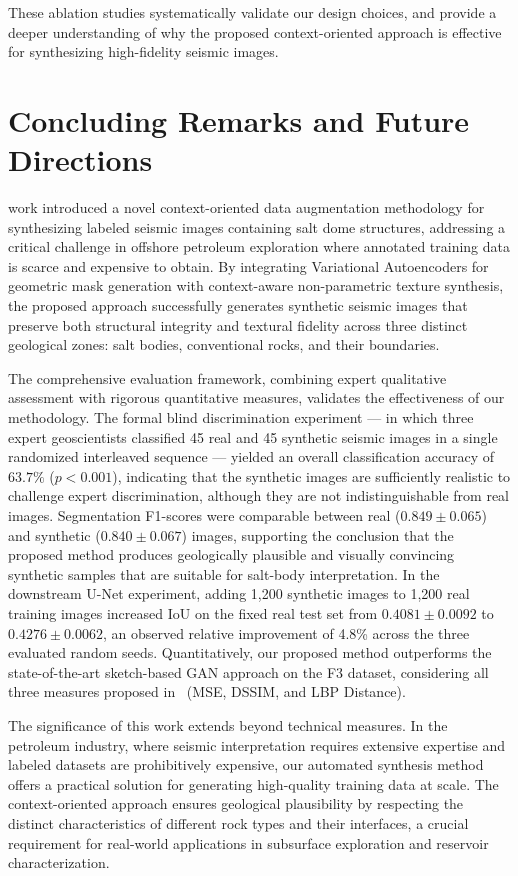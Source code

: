\documentclass{ieeeaccess}
\begin{document}
These ablation studies systematically validate our design choices, and provide a deeper understanding of why the proposed context-oriented approach is effective for synthesizing high-fidelity seismic images.


\section{Concluding Remarks and Future Directions}
\label{sec:conclusion}

 work introduced a novel context-oriented data augmentation methodology for synthesizing labeled seismic images containing salt dome structures, addressing a critical challenge in offshore petroleum exploration where annotated training data is scarce and expensive to obtain. By integrating Variational Autoencoders for geometric mask generation with context-aware non-parametric texture synthesis, the proposed approach successfully generates synthetic seismic images that preserve both structural integrity and textural fidelity across three distinct geological zones: salt bodies, conventional rocks, and their boundaries.

The comprehensive evaluation framework, combining expert qualitative assessment with rigorous quantitative measures, validates the effectiveness of our methodology. The formal blind discrimination experiment — in which three expert geoscientists classified 45 real and 45 synthetic seismic images in a single randomized interleaved sequence — yielded an overall classification accuracy of $63.7\%$ ($p < 0.001$), indicating that the synthetic images are sufficiently realistic to challenge expert discrimination, although they are not indistinguishable from real images. Segmentation F1-scores were comparable between real ($0.849 \pm 0.065$) and synthetic ($0.840 \pm 0.067$) images, supporting the conclusion that the proposed method produces geologically plausible and visually convincing synthetic samples that are suitable for salt-body interpretation. In the downstream U-Net experiment, adding 1,200 synthetic images to 1,200 real training images increased IoU on the fixed real test set from $0.4081 \pm 0.0092$ to $0.4276 \pm 0.0062$, an observed relative improvement of 4.8\% across the three evaluated random seeds. Quantitatively, our proposed method outperforms the state-of-the-art sketch-based GAN approach on the F3 dataset, considering all three measures proposed in~\cite{Ferreira2020} (MSE, DSSIM, and LBP Distance).

The significance of this work extends beyond technical measures. In the petroleum industry, where seismic interpretation requires extensive expertise and labeled datasets are prohibitively expensive, our automated synthesis method offers a practical solution for generating high-quality training data at scale. The context-oriented approach ensures geological plausibility by respecting the distinct characteristics of different rock types and their interfaces, a crucial requirement for real-world applications in subsurface exploration and reservoir characterization.
\end{document}
